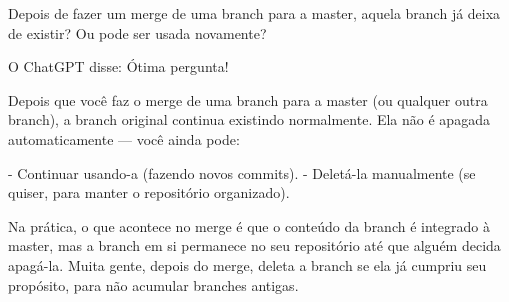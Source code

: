 Depois de fazer um merge de uma branch para a master, aquela branch já deixa de existir? Ou pode ser usada novamente?

O ChatGPT disse:
Ótima pergunta!

Depois que você faz o merge de uma branch para a master (ou qualquer outra branch), a branch original continua existindo normalmente.
Ela não é apagada automaticamente — você ainda pode:

- Continuar usando-a (fazendo novos commits).
- Deletá-la manualmente (se quiser, para manter o repositório organizado).

Na prática, o que acontece no merge é que o conteúdo da branch é integrado à master, mas a branch em si permanece no seu repositório até que alguém decida apagá-la.
Muita gente, depois do merge, deleta a branch se ela já cumpriu seu propósito, para não acumular branches antigas.